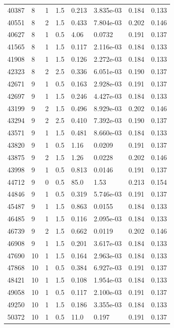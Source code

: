 \documentclass[preview]{standalone}
\begin{document}
{{{\begin{tabular}{L{1.2cm}C{1.2cm} C{0.3cm}C{0.5cm} C{1.4cm}C{1.4cm} C{1.4cm}C{1.4cm}}
  40387  &     8  & 1     & 1.5 &  0.213  & 3.835e-03  & 0.184 &  0.133   \\ 
  40551  &     8  & 2     & 1.5 &  0.433  & 7.804e-03  & 0.202 &  0.146   \\ 
  40627  &     8  & 1     & 0.5 &  4.06  & 0.0732  & 0.191 &  0.137   \\ 
  41565  &     8  & 1     & 1.5 &  0.117  & 2.116e-03  & 0.184 &  0.133   \\ 
  41908  &     8  & 1     & 1.5 &  0.126  & 2.272e-03  & 0.184 &  0.133   \\ 
  42323  &     8  & 2     & 2.5 &  0.336  & 6.051e-03  & 0.190 &  0.137   \\ 
  42671  &     9  & 1     & 0.5 &  0.163  & 2.928e-03  & 0.191 &  0.137   \\ 
  42697  &     9  & 1     & 1.5 &  0.246  & 4.427e-03  & 0.184 &  0.133   \\ 
  43199  &     9  & 2     & 1.5 &  0.496  & 8.929e-03  & 0.202 &  0.146   \\ 
  43294  &     9  & 2     & 2.5 &  0.410  & 7.392e-03  & 0.190 &  0.137   \\ 
  43571  &     9  & 1     & 1.5 &  0.481  & 8.660e-03  & 0.184 &  0.133   \\ 
  43820  &     9  & 1     & 0.5 &  1.16  & 0.0209  & 0.191 &  0.137   \\ 
  43875  &     9  & 2     & 1.5 &  1.26  & 0.0228  & 0.202 &  0.146   \\ 
  43998  &     9  & 1     & 0.5 &  0.813  & 0.0146  & 0.191 &  0.137   \\ 
  44712  &     9  & 0     & 0.5 &  85.0  & 1.53  & 0.213 &  0.154   \\ 
  44846  &     9  & 1     & 0.5 &  0.319  & 5.746e-03  & 0.191 &  0.137   \\ 
  45487  &     9  & 1     & 1.5 &  0.863  & 0.0155  & 0.184 &  0.133   \\ 
  46485  &     9  & 1     & 1.5 &  0.116  & 2.095e-03  & 0.184 &  0.133   \\ 
  46739  &     9  & 2     & 1.5 &  0.662  & 0.0119  & 0.202 &  0.146   \\ 
  46908  &     9  & 1     & 1.5 &  0.201  & 3.617e-03  & 0.184 &  0.133   \\ 
  47690  &    10  & 1     & 1.5 &  0.164  & 2.963e-03  & 0.184 &  0.133   \\ 
  47868  &    10  & 1     & 0.5 &  0.384  & 6.927e-03  & 0.191 &  0.137   \\ 
  48421  &    10  & 1     & 1.5 &  0.108  & 1.954e-03  & 0.184 &  0.133   \\ 
  49058  &    10  & 1     & 0.5 &  0.117  & 2.100e-03  & 0.191 &  0.137   \\ 
  49250  &    10  & 1     & 1.5 &  0.186  & 3.355e-03  & 0.184 &  0.133   \\ 
  50372  &    10  & 1     & 0.5 &  11.0  & 0.197  & 0.191 &  0.137   \\ 
\hline 
\end{tabular} 

}}}
\end{document}
